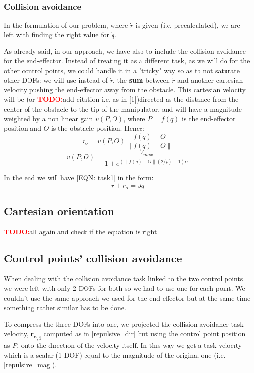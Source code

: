 \documentclass[12pt,a4paper, twocolumn, twoside]{article}
\newcommand{\todo}{\textcolor{red}{\textbf{TODO:}}}
\begin{document}
\subsubsection{Collision avoidance}
In the formulation of our problem, where $\dot{r}$ is given (i.e. precalculated), we are left with finding the right value for $\dot{q}$.

As already said, in our approach, we have also to include the collision avoidance for the end-effector. Instead of treating it as a different task, as we will do for the other control points, we could handle it in a "tricky" way so as to not saturate other DOFs: we will use instead of $\dot{r}$, the \textbf{sum} between $\dot{r}$ and another cartesian velocity pushing the end-effector away from the obstacle. This cartesian velocity will be (or \todo add citation i.e. as in [1])directed as the distance from the center of the obstacle to the tip of the manipulator, and will have a magnitude weighted by a non linear gain $v(P,O)$, where $P = f(q)$ is the end-effector position and $O$ is the obstacle position.
Hence:
\begin{equation}\label{repulsive_dir}
\dot{r_o} = v(P,O)\frac{f(q) - O}{\lVert f(q) - O \rVert}
\end{equation}
\begin{equation}\label{repulsive_mag}
v(P,O) = \frac{V_{max}}{1+e^{(\lVert f(q) -O \rVert(2/\rho)-1)\alpha}}
\end{equation}

In the end we will have \eqref{EQN: task1} in the form: 
\[
\dot{r} + \dot{r_o} = J\dot{q}
\]
\subsection[Task 2]{Cartesian orientation}
\todo all again and check if the equation is right
\subsection[Tasks 3 \& 4]{Control points' collision avoidance}
When dealing with the collision avoidance task linked to the two control points we were left with only 2 DOFs for both so we had to use one for each point. We couldn't use the same approach we used for the end-effector but at the same time something rather similar has to be done. 

To compress the three DOFs into one, we projected the collision avoidance task velocity, $\mathbf{\dot{r_{o}}_{,i}}$ computed as in \eqref{repulsive_dir} but using the control point position as $P$, onto the direction of the velocity itself. In this way we get a task velocity which is a scalar (1 DOF) equal to the magnitude of the original one (i.e. \eqref{repulsive_mag}).
\end{document}
